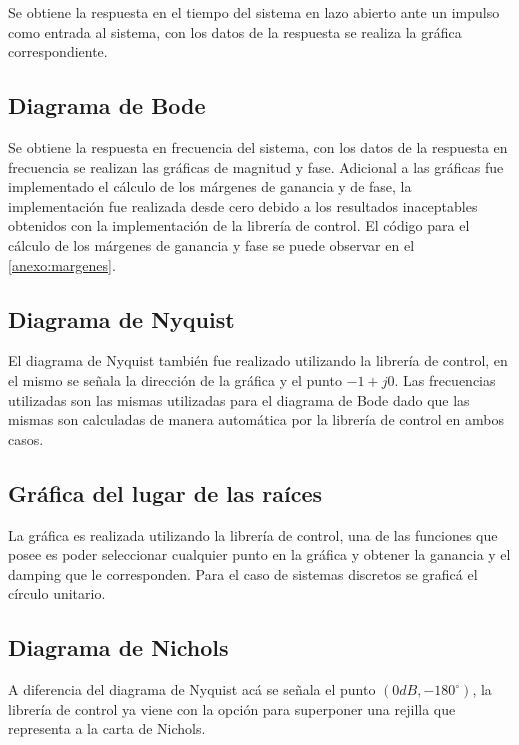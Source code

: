         Se obtiene la respuesta en el tiempo del sistema en lazo abierto ante un impulso como entrada al sistema, con los datos de la respuesta se realiza la gráfica correspondiente.

    \subsection{Diagrama de Bode}
        
        Se obtiene la respuesta en frecuencia del sistema, con los datos de la respuesta en frecuencia se realizan las gráficas de magnitud y fase. Adicional a las gráficas fue implementado el cálculo de los márgenes de ganancia y de fase, la implementación fue realizada desde cero debido a los resultados inaceptables obtenidos con la implementación de la librería de control. El código para el cálculo de los márgenes de ganancia y fase se puede observar en el \ref{anexo:margenes}.
    
    \subsection{Diagrama de Nyquist}
        
        El diagrama de Nyquist también fue realizado utilizando la librería de control, en el mismo se señala la dirección de la gráfica y el punto $-1 + j0$. Las frecuencias utilizadas son las mismas utilizadas para el diagrama de Bode dado que las mismas son calculadas de manera automática por la librería de control en ambos casos.
    
    \subsection{Gráfica del lugar de las raíces}
        
        La gráfica es realizada utilizando la librería de control, una de las funciones que posee es poder seleccionar cualquier punto en la gráfica y obtener la ganancia y el damping que le corresponden. Para el caso de sistemas discretos se graficá el círculo unitario.
    
    \subsection{Diagrama de Nichols}
        
        A diferencia del diagrama de Nyquist acá se señala el punto $(0dB, -180^\circ)$, la librería de control ya viene con la opción para superponer una rejilla que representa a la carta de Nichols.

